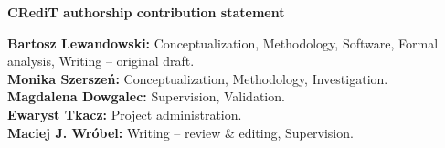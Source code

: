 \documentclass[11pt]{article}
\begin{document}
\vspace{1.5em}
\noindent\textbf{CRediT authorship contribution statement}\par
\noindent\textbf{Bartosz Lewandowski:} Conceptualization, Methodology, Software, Formal analysis, Writing – original draft.\\
\textbf{Monika Szerszeń:} Conceptualization, Methodology, Investigation.\\
\textbf{Magdalena Dowgalec:} Supervision, Validation.\\
\textbf{Ewaryst Tkacz:} Project administration.\\
\textbf{Maciej J. Wróbel:} Writing – review \& editing, Supervision.
\end{document}

